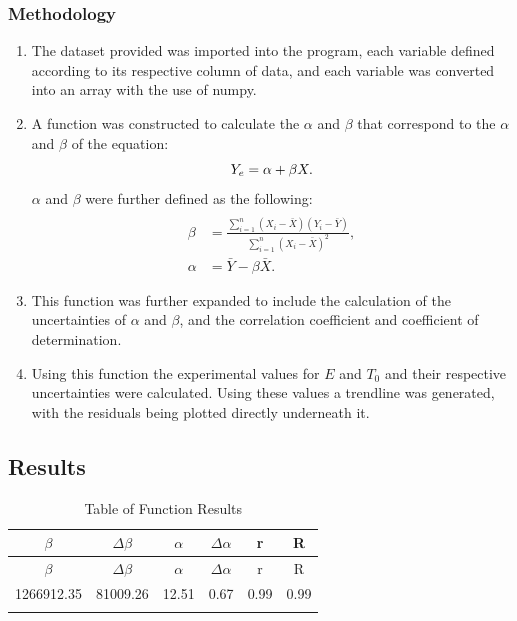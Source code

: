 \documentclass[12pt, a4paper]{article}
\begin{document}
\subsubsection{Methodology}
\begin{enumerate}
    \item The dataset provided was imported into the program, each variable defined according to its respective column of data, and each variable was converted into an array with the use of numpy.
    \item A function was constructed to calculate the \(\alpha\) and \(\beta\) that correspond to the \(\alpha\) and \(\beta\) of the equation:
    \begin{equation}
        \label{equation 1}\\
        Y_e = \alpha + \beta X .
    \end{equation}
    \(\alpha\) and \(\beta\) were further defined as the following:
    \begin{align}
        \label{equation 2}\\
        \beta &= \frac{\sum_{i=1}^{n}(X_i - \bar{X})(Y_i - \bar{Y})}{\sum_{i=1}^{n}(X_i - \bar{X})^2} ,\\
        \label{equation 3}
        \alpha &= \bar{Y} - \beta \bar{X} .
    \end{align}
    \item This function was further expanded to include the calculation of the uncertainties of \(\alpha\) and \(\beta\), and the correlation coefficient and coefficient of determination.
    \item Using this function the experimental values for \(E\) and \(T_0\) and their respective uncertainties were calculated. Using these values a trendline was generated, with the residuals being plotted directly underneath it. 
\end{enumerate}

\subsection{Results}
\begin{longtable}{|c|c|c|c|c|c|}
\hline \(\beta\) & \(\Delta \beta\) & \(\alpha\) & \(\Delta \alpha\) & r & R\\ \hline
\endfirsthead

\hline \(\beta\) & \(\Delta \beta\) & \(\alpha\) & \(\Delta \alpha\) & r & R\\ \hline
\endhead

1266912.35 & 81009.26 & 12.51 & 0.67 & 0.99 & 0.99\\ \hline

\caption{Table of Function Results}
\label{tab: Table 1.1}\\
\end{longtable}
\end{document}

